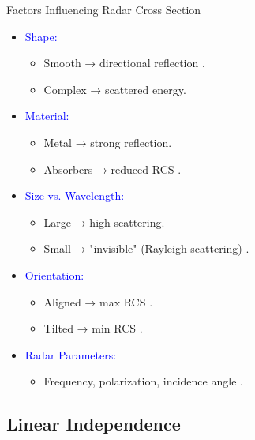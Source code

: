 \begin{frame}{Factors Influencing Radar Cross Section}
    \small
    \begin{itemize}
        \item \textcolor{blue}{Shape:}
            \begin{itemize}
                \item Smooth → directional reflection \cite[p. 47]{knott2004radar}.
                \item Complex → scattered energy.
            \end{itemize}
        \item \textcolor{blue}{Material:}
            \begin{itemize}
                \item Metal → strong reflection.
                \item Absorbers → reduced RCS \cite[Section 3.2]{knott2004radar}.
            \end{itemize}
        \item \textcolor{blue}{Size vs. Wavelength:}
            \begin{itemize}
                \item Large → high scattering.
                \item Small → "invisible" (Rayleigh scattering) \cite[p. 188]{kolosov1987}.
            \end{itemize}
        \item \textcolor{blue}{Orientation:}
            \begin{itemize}
                \item Aligned → max RCS \cite[Eq. 2.1]{knott2004radar}.
                \item Tilted → min RCS \cite[p. 22]{skolnik1962introduction}.
            \end{itemize}
        \item \textcolor{blue}{Radar Parameters:}
            \begin{itemize}
                \item Frequency, polarization, incidence angle \cite[p. 45]{cite-trcs}.
            \end{itemize}
    \end{itemize}
\end{frame}


\subsection{Linear Independence}
	
